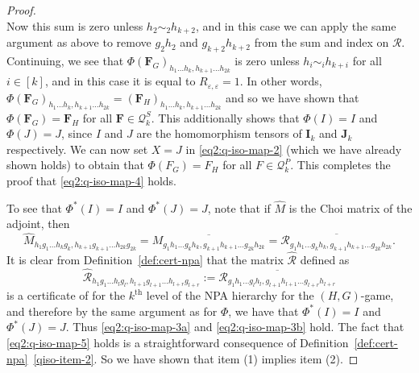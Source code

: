 \documentclass[11pt,a4paper]{article}
\theoremstyle{plain}
\theoremstyle{remark}
\theoremstyle{definition}
\renewcommand\epsilon\varepsilon
\begin{document}
\begin{proof}
\begin{equation}
\end{equation}
Now this sum is zero unless $h_2 \sim_2 h_{k+2}$, and in this case we can apply the same argument as above to remove $g_2h_2$ and $g_{k+2}h_{k+2}$ from the sum and index on $\mathcal{R}$. Continuing, we see that $\Phi(\boldsymbol{F}_G)_{h_1 \ldots h_k,h_{k+1}\ldots h_{2k}}$ is zero unless $h_i \sim_i h_{k+i}$ for all $i \in [k]$, and in this case it is equal to $R_{\epsilon,\epsilon} = 1$. In other words, $\Phi(\boldsymbol{F}_G)_{h_1 \ldots h_k,h_{k+1}\ldots h_{2k}} = (\boldsymbol{F}_H)_{h_1 \ldots h_k,h_{k+1}\ldots h_{2k}}$ and so we have shown that $\Phi(\boldsymbol{F}_G) = \boldsymbol{F}_H$ for all $\boldsymbol{F} \in \mathcal{Q}_k^S$. This additionally shows that $\Phi(I) = I$ and $\Phi(J) = J$, since $I$ and $J$ are the homomorphism tensors of $\boldsymbol{I}_k$ and $\boldsymbol{J}_k$ respectively. We can now set $X=J$ in \eqref{eq2:q-iso-map-2} (which we have already shown holds) to obtain that $\Phi(F_G) = F_H$ for all $F \in \mathcal{Q}_k^P$. This completes the proof that \eqref{eq2:q-iso-map-4} holds.

To see that $\Phi^*(I) = I$ and $\Phi^*(J) = J$, note that if $\hat{M}$ is the Choi matrix of the adjoint, then
\[\hat{M}_{h_1g_1\ldots h_kg_k, h_{k+1}g_{k+1}\ldots h_{2k}g_{2k}} = \overline{M_{g_1h_1\ldots g_kh_k, g_{k+1}h_{k+1}\ldots g_{2k}h_{2k}}} = \overline{\mathcal{R}_{g_1h_1\ldots g_kh_k, g_{k+1}h_{k+1}\ldots g_{2k}h_{2k}}}.\]
It is clear from Definition~\ref{def:cert-npa} that the matrix $\hat{\mathcal{R}}$ defined as
\[\hat{\mathcal{R}}_{h_1g_1\ldots h_lg_l, h_{l+1}g_{l+1}\ldots h_{l+r}g_{l+r}}:= \overline{\mathcal{R}_{g_1h_1\ldots g_lh_l, g_{l+1}h_{l+1}\ldots g_{l+r}h_{l+r}}}\]
is a certificate of for the $k^\text{th}$ level of the NPA hierarchy for the $(H,G)$-game, and therefore by the same argument as for $\Phi$, we have that $\Phi^*(I) = I$ and $\Phi^*(J) = J$. Thus \eqref{eq2:q-iso-map-3a} and \eqref{eq2:q-iso-map-3b} hold. The fact that \eqref{eq2:q-iso-map-5} holds is a straightforward consequence of Definition~\ref{def:cert-npa}~\ref{qiso-item-2}. So we have shown that item (1) implies item (2).


\end{proof}
\end{document}

